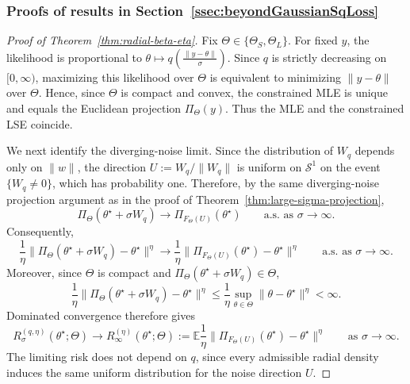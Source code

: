 \documentclass[11pt]{article}
\theoremstyle{plain}
\theoremstyle{definition}
\newcommand{\E}{\mathbb{E}}
\newcommand{\mcS}{\mathcal{S}}
\begin{document}
\subsubsection{Proofs of results in Section~\ref{ssec:beyondGaussianSqLoss}}
\begin{proof}[Proof of Theorem~\ref{thm:radial-beta-eta}]
Fix $\Theta\in\{\Theta_S,\Theta_L\}$. For fixed $y$, the likelihood is
proportional to $\theta
    \mapsto
    q\left(\frac{\|y-\theta\|}{\sigma}\right)$. Since $q$ is strictly decreasing on $[0,\infty)$, maximizing this likelihood
over $\Theta$ is equivalent to minimizing $\|y-\theta\|$ over $\Theta$.
Hence, since $\Theta$ is compact and convex, the constrained MLE is unique and
equals the Euclidean projection $\Pi_\Theta(y)$. Thus the MLE and the
constrained LSE coincide.

We next identify the diverging-noise limit. Since the distribution of $W_q$ depends only on $\|w\|$, the direction $U:=W_q/\|W_q\|$ is uniform on $\mcS^1$ on the event
$\{W_q\neq0\}$, which has probability one. Therefore, by the same diverging-noise
projection argument as in the proof of Theorem~\ref{thm:large-sigma-projection},
\[
    \Pi_\Theta(\theta^\star+\sigma W_q)
    \longrightarrow
    \Pi_{F_\Theta(U)}(\theta^\star)
    \qquad\text{a.s. as } \sigma\to\infty .
\]
Consequently,
\[
    \frac1\eta
    \|
        \Pi_\Theta(\theta^\star+\sigma W_q)-\theta^\star
    \|^\eta
    \longrightarrow
    \frac1\eta
    \|
        \Pi_{F_\Theta(U)}(\theta^\star)-\theta^\star
    \|^\eta
    \qquad\text{a.s. as } \sigma\to\infty .
\]
Moreover, since $\Theta$ is compact and
$\Pi_\Theta(\theta^\star+\sigma W_q)\in\Theta$,
\[
    \frac1\eta
    \|
        \Pi_\Theta(\theta^\star+\sigma W_q)-\theta^\star
    \|^\eta
    \le
    \frac1\eta
    \sup_{\theta\in\Theta}\|\theta-\theta^\star\|^\eta
    <\infty .
\]
Dominated convergence therefore gives
\[
    R_{\sigma}^{(q,\eta)}(\theta^\star;\Theta)
    \longrightarrow
    R_{\infty}^{(\eta)}(\theta^\star;\Theta)
    :=
    \E\frac1\eta
    \|
        \Pi_{F_\Theta(U)}(\theta^\star)-\theta^\star
    \|^\eta
    \qquad\text{as } \sigma\to\infty .
\]
The limiting risk does not depend on $q$, since every admissible radial
density induces the same uniform distribution for the noise direction $U$.


\end{proof}
\end{document}
